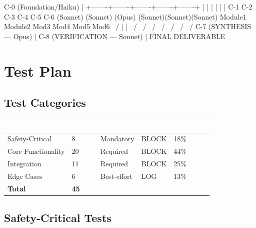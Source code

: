 \documentclass[11pt,letterpaper]{article}
\newcommand{\tableheader}[1]{\textbf{\sffamily\textcolor{white}{#1}}}
\begin{document}
\begin{asciibox}
C-0 (Foundation/Haiku)
    |
    +-------+-------+-------+-------+-------+
    |       |       |       |       |       |
   C-1     C-2     C-3     C-4     C-5     C-6
 (Sonnet) (Sonnet) (Opus) (Sonnet)(Sonnet)(Sonnet)
 Module1  Module2  Mod3   Mod4    Mod5    Mod6
    \       /       |       |       \       /
     \     /        \      /         \     /
      \   /          \    /           \   /
       C-7 (SYNTHESIS --- Opus)
              |
           C-8 (VERIFICATION --- Sonnet)
              |
           FINAL DELIVERABLE
\end{asciibox}

\section{Test Plan}

\subsection{Test Categories}

\begin{center}
\begin{tabularx}{\textwidth}{L{3.5cm}C{2cm}C{2cm}C{2cm}C{2.5cm}}
\toprule
{}
\tableheader{Category} & \tableheader{Count} & \tableheader{Priority} & \tableheader{Action} & \tableheader{Target \%} \\
\midrule
Safety-Critical & 8 & Mandatory & BLOCK & 18\% \\
Core Functionality & 20 & Required & BLOCK & 44\% \\
Integration & 11 & Required & BLOCK & 25\% \\
Edge Cases & 6 & Best-effort & LOG & 13\% \\
\midrule
\textbf{Total} & \textbf{45} & & & \\
\bottomrule
\end{tabularx}
\end{center}

\subsection{Safety-Critical Tests}
\end{document}
